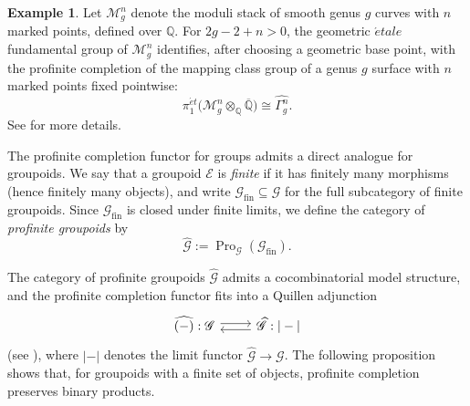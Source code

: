 \documentclass{amsart}
\newcommand{\calM}{\mathcal{M}}
\newcommand{\Grpd}{\mathscr{G}}
\newcommand{\Pro}{\operatorname{Pro}}
\theoremstyle{definition}
\newtheorem{example}[theorem]{Example}%
\numberwithin{equation}{section}
\begin{document}
\begin{example}\label{example: mapping class groups}
Let $\calM_g^n$ denote the moduli stack of smooth genus $g$ curves with
$n$ marked points, defined over $\mathbb Q$.  For $2g-2+n>0$, the
geometric $\acute etale$ fundamental group of $\calM_g^n$ identifies,
after choosing a geometric base point, with the profinite completion of the
mapping class group of a genus $g$ surface with $n$ marked points fixed
pointwise:
\[
\pi_1^{\acute et}\bigl(\calM_g^n\otimes_{\mathbb Q}\overline{\mathbb Q}\bigr)
\cong \widehat{\Gamma_g^n}.
\]
See \cite{matsumoto2000arithmetic,boggi2009fundamental} for more details. 
\end{example}

The profinite completion functor for groups admits a direct analogue for groupoids. We say that a
groupoid $\mathscr{E}$ is \emph{finite} if it has finitely many morphisms (hence finitely many objects),
and write $\Grpd_{\mathrm{fin}}\subseteq \Grpd$ for the full subcategory of finite groupoids. Since
$\Grpd_{\mathrm{fin}}$ is closed under finite limits, we define the category of \emph{profinite groupoids} by
\[
\widehat{\Grpd}:=\Pro_{\Grpd}(\Grpd_{\mathrm{fin}}).
\]



The category of profinite groupoids $\widehat{\Grpd}$ admits a cocombinatorial model structure, and
the profinite completion functor fits into a Quillen adjunction
\[
\begin{tikzcd}
\widehat{(-)}:\Grpd \arrow[r, shift left=1] &
\arrow[l, shift left=1] \widehat{\Grpd}:|-|
\end{tikzcd}
\]
(see \cite[Theorem~4.12 and Proposition~4.22]{Horel_profinite_groupoids}), where $|-|$ denotes the
limit functor $\widehat{\Grpd}\to \Grpd$. 
The following proposition shows that, for groupoids with a finite set of objects, profinite completion
preserves binary products.
\end{document}
